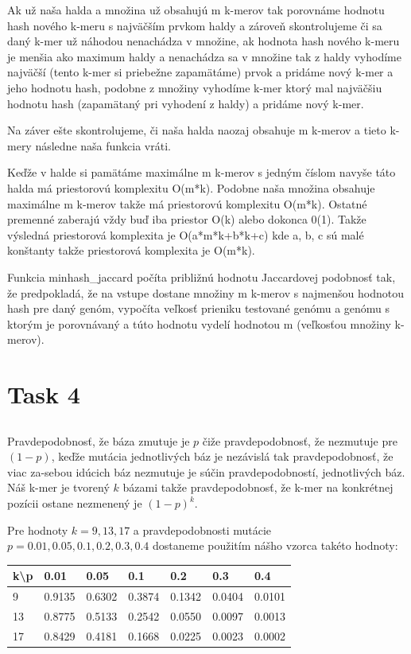 \documentclass[a4paper]{article}
\begin{document}
Ak už naša halda a množina už obsahujú m k-merov tak porovnáme hodnotu hash nového k-meru s najväčším prvkom haldy a zároveň skontrolujeme či sa daný k-mer už náhodou nenachádza v množine, ak hodnota hash nového k-meru je menšia ako maximum haldy a nenachádza sa v množine tak z haldy vyhodíme najväčší (tento k-mer si priebežne zapamätáme) prvok a pridáme nový k-mer a jeho hodnotu hash, podobne z množiny vyhodíme k-mer ktorý mal najväčšiu hodnotu hash (zapamätaný pri vyhodení z haldy) a pridáme nový k-mer.

Na záver ešte skontrolujeme, či naša halda naozaj obsahuje m k-merov a tieto k-mery následne naša funkcia vráti.

Keďže v halde si pamätáme maximálne m k-merov s jedným číslom navyše táto halda má priestorovú komplexitu O(m*k). Podobne naša množina obsahuje maximálne m k-merov takže má priestorovú komplexitu O(m*k). Ostatné premenné zaberajú vždy buď iba priestor O(k) alebo dokonca 0(1). Takže výsledná priestorová komplexita je O(a*m*k+b*k+c) kde a, b, c sú malé konštanty takže priestorová komplexita je O(m*k).

Funkcia minhash\_jaccard počíta približnú hodnotu Jaccardovej podobnosť tak, že predpokladá, že na vstupe dostane množiny m k-merov s najmenšou hodnotou hash pre daný genóm, vypočíta veľkosť prieniku testované genómu a genómu s ktorým je porovnávaný a túto hodnotu vydelí hodnotou m (veľkosťou množiny k-merov).

\section{Task 4} 

\subsection{}

Pravdepodobnosť, že báza zmutuje je $p$ čiže pravdepodobnosť, že nezmutuje pre $(1-p)$, keďže mutácia jednotlivých báz je nezávislá tak pravdepodobnosť, že viac za-sebou idúcich báz nezmutuje je súčin pravdepodobností, jednotlivých báz. Náš k-mer je tvorený $k$ bázami takže pravdepodobnosť, že k-mer na konkrétnej pozícii ostane nezmenený je $(1-p)^k$.

Pre hodnoty $k=9,13,17$ a pravdepodobnosti mutácie $p=0.01, 0.05, 0.1, 0.2, 0.3, 0.4$ dostaneme použitím nášho vzorca takéto hodnoty:


\begin{table}[!h]
	\begin{tabular}{|l|l|l|l|l|l|l|}
		\hline
		k\textbackslash p & 0.01   & 0.05   & 0.1    & 0.2    & 0.3    & 0.4    \\ \hline
		9   & 0.9135 & 0.6302 & 0.3874 & 0.1342 & 0.0404 & 0.0101 \\ \hline
		13  & 0.8775 & 0.5133 & 0.2542 & 0.0550 & 0.0097 & 0.0013 \\ \hline
		17  & 0.8429 & 0.4181 & 0.1668 & 0.0225 & 0.0023 & 0.0002 \\ \hline
	\end{tabular}
\end{table}
\end{document}
